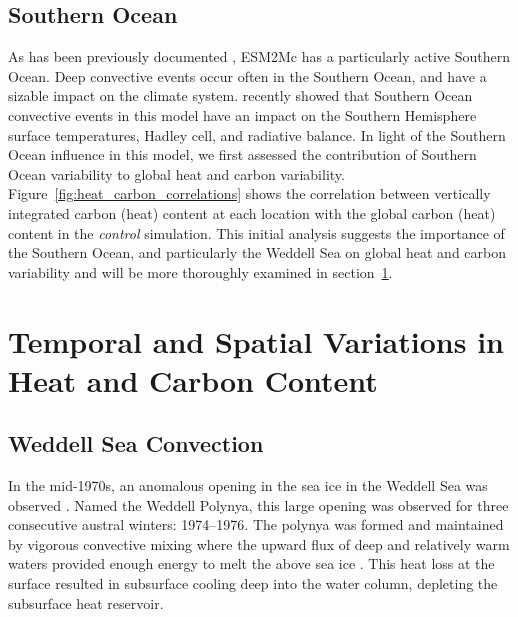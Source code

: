 \subsection{Southern Ocean}
As has been previously documented \citep{DeLavergne2014a}, ESM2Mc has a
particularly active Southern Ocean. Deep convective events
occur often in the Southern Ocean, and have a sizable impact on the climate
system. \citet{Cabre} recently showed that Southern Ocean convective events in
this model have an impact on the Southern Hemisphere surface temperatures,
Hadley cell, and radiative balance. In light of the Southern Ocean influence in
this model, we first assessed the contribution of Southern Ocean variability to
global heat and carbon variability. Figure~\ref{fig:heat_carbon_correlations}
shows the correlation between vertically integrated carbon (heat) content at
each location with the global carbon (heat) content in the  \textit{control}
simulation. This initial analysis suggests the importance of  the Southern
Ocean, and particularly the Weddell Sea on global heat and carbon  variability
and will be more thoroughly examined in
section~\ref{section:Temporal and Spatial Variations in Heat and Carbon Content}.

\section{Temporal and Spatial Variations in Heat and Carbon Content}
\label{section:Temporal and Spatial Variations in Heat and Carbon Content}


\subsection{Weddell Sea Convection}
In the mid-1970s, an anomalous opening in the sea ice in the Weddell Sea was
observed \citep{Carsey2009}. Named the Weddell Polynya, this large opening was
observed for three consecutive austral winters: 1974--1976. The polynya was
formed and maintained by vigorous convective mixing where the upward flux of
deep and relatively warm waters provided enough energy to melt the above sea
ice \citep{Gordon1982,Martinson1981}. This heat loss at the surface resulted in
subsurface cooling deep into the water column, depleting the subsurface heat
reservoir.

